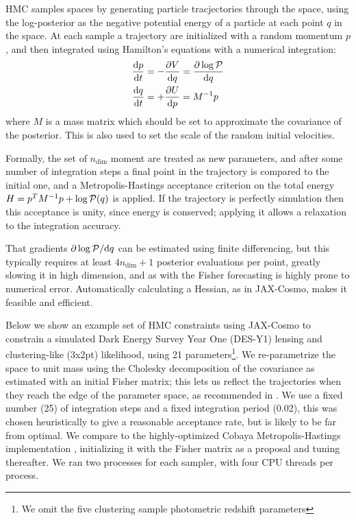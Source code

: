 \documentclass[final,5p,times,twocolumn,authoryear]{elsarticle}
\begin{document}
HMC samples spaces by generating particle tracjectories through the space, using the log-posterior
as the negative potential energy of a particle at each point $q$ in the space.  At each sample a trajectory are initialized
with a random momentum $p$, and then integrated using Hamilton's equations with a numerical integration:
\begin{align}
\frac{\mathrm{d}p}{\mathrm{d}t} &= - \frac{\partial V}{\mathrm{d} q} = \frac{\partial \log{\cal P}}{\mathrm{d} q}\\
\frac{\mathrm{d}q}{\mathrm{d}t} &= + \frac{\partial U}{\mathrm{d} p} = M^{-1} p
\end{align}
where $M$ is a mass matrix which should be set to approximate the covariance of the posterior. This is also
used to set the scale of the random initial velocities.

Formally, the set of $n_\mathrm{dim}$ moment are treated as new parameters, and after 
some number of integration steps a final point in the trajectory is compared to the initial one,
and a Metropolis-Hastings acceptance criterion on the total energy $H = p^T M^{-1} p + \log{\cal P}(q)$ is applied.
If the trajectory is perfectly simulation then this acceptance is unity, since energy is conserved; applying it allows
a relaxation to the integration accuracy.

That gradients $\partial \log{\cal P} / \mathrm{d} q$ can be estimated using finite differencing,
but this typically requires at least $4 n_{\mathrm{dim}} + 1$ posterior evaluations per point, greatly slowing it
in high dimension, and as with the Fisher forecasting is highly prone to numerical error. Automatically
calculating a Hessian, as in JAX-Cosmo, makes it feasible and efficient.

Below we show an example set of HMC constraints using JAX-Cosmo to constrain a simulated
Dark Energy Survey Year One (DES-Y1) lensing and clustering-like (3x2pt) likelihood, using 21 parameters\footnote{We omit the 
five clustering sample photometric redshift parameters}.  We re-parametrize the space to unit mass using the Cholesky 
decomposition
of the covariance as estimated with an initial Fisher matrix; this lets us reflect the trajectories when they reach the
edge of the parameter space, as recommended in \citep{NIPS2015_8303a79b}.  We use a fixed number (25) of integration steps and 
a fixed integration period (0.02), this was chosen heuristically to give a reasonable acceptance rate, but is likely to be
far from optimal.  We compare to the highly-optimized {\sc Cobaya} 
Metropolis-Hastings implementation \citep{cobaya2,cobaya1}, initializing it with the Fisher matrix as a proposal and
tuning thereafter.  We ran two processes for each sampler, with four CPU threads per process.
\end{document}
